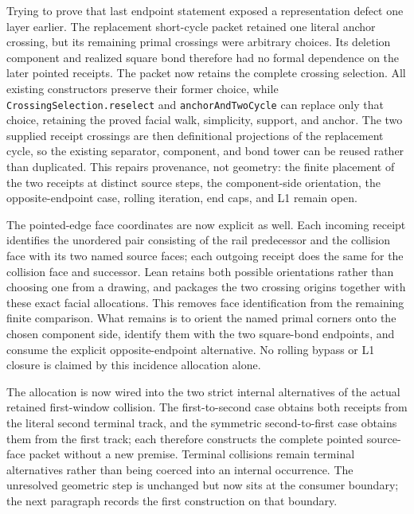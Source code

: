 \documentclass[11pt]{article}
\theoremstyle{definition}
\begin{document}
Trying to prove that last endpoint statement exposed a representation defect
one layer earlier.  The replacement short-cycle packet retained one literal
anchor crossing, but its remaining primal crossings were arbitrary choices.
Its deletion component and realized square bond therefore had no formal
dependence on the later pointed receipts.  The packet now retains the complete
crossing selection.  All existing constructors preserve their former choice,
while
\texttt{CrossingSelection.reselect} and
\texttt{anchorAndTwoCycle} can replace only that choice, retaining the proved
facial walk, simplicity, support, and anchor.  The two supplied receipt
crossings are then definitional projections of the replacement cycle, so the
existing separator, component, and bond tower can be reused rather than
duplicated.  This repairs provenance, not geometry: the finite placement of
the two receipts at distinct source steps, the component-side orientation,
the opposite-endpoint case, rolling iteration, end caps, and L1 remain open.

The pointed-edge face coordinates are now explicit as well.  Each incoming
receipt identifies the unordered pair consisting of the rail predecessor and
the collision face with its two named source faces; each outgoing receipt does
the same for the collision face and successor.  Lean retains both possible
orientations rather than choosing one from a drawing, and packages the two
crossing origins together with these exact facial allocations.  This removes
face identification from the remaining finite comparison.  What remains is
to orient the named primal corners onto the chosen component side, identify
them with the two square-bond endpoints, and consume the explicit
opposite-endpoint alternative.  No rolling bypass or L1 closure is claimed by
this incidence allocation alone.

The allocation is now wired into the two strict internal alternatives of the
actual retained first-window collision.  The first-to-second case obtains both
receipts from the literal second terminal track, and the symmetric
second-to-first case obtains them from the first track; each therefore
constructs the complete pointed source-face packet without a new premise.
Terminal collisions remain terminal alternatives rather than being coerced
into an internal occurrence.  The unresolved geometric step is unchanged but
now sits at the consumer boundary; the next paragraph records the first
construction on that boundary.
\end{document}
